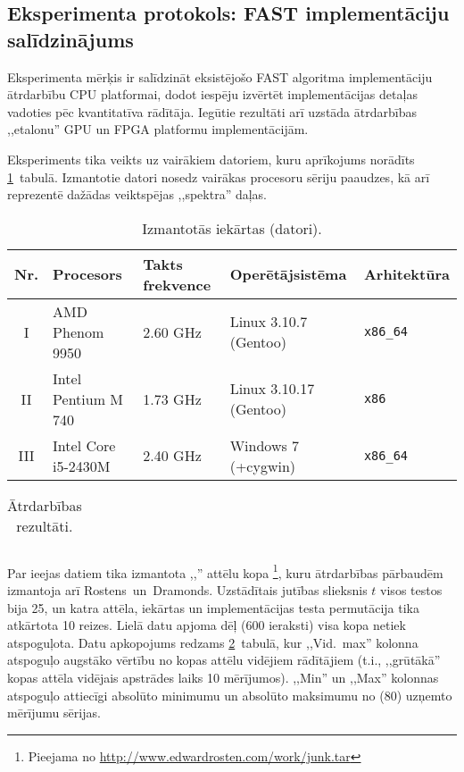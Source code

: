 \subsection{Eksperimenta protokols: FAST implementāciju salīdzinājums}\label{appx:test1}
Eksperimenta mērķis ir salīdzināt
eksistējošo FAST algoritma implementāciju ātrdarbību CPU platformai, 
dodot iespēju izvērtēt implementācijas detaļas vadoties 
pēc kvantitatīva rādītāja. Iegūtie rezultāti arī uzstāda ātrdarbības 
,,etalonu'' GPU un FPGA platformu implementācijām.

Eksperiments tika veikts uz vairākiem datoriem, kuru aprīkojums norādīts
\ref{tbl:test1-dev}~tabulā. Izmantotie datori nosedz vairākas procesoru
sēriju paaudzes, kā arī reprezentē dažādas veiktspējas ,,spektra'' daļas.
\begin{table}[hb]\footnotesize
	\centering
	\caption{Izmantotās iekārtas (datori).}
	\label{tbl:test1-dev}
	\vspace{4pt}
	\begin{tabular}{cllll}
		\toprule
		\textbf{Nr.} & \textbf{Procesors} & \textbf{Takts frekvence} & 
			\textbf{Operētājsistēma} & \textbf{Arhitektūra}\\
		\midrule
		I & AMD Phenom 9950 & 2.60 GHz & Linux 3.10.7 (Gentoo) & \texttt{x86\_64}\\
		II & Intel Pentium M 740 & 1.73 GHz & Linux 3.10.17 (Gentoo) & \texttt{x86}\\
		III & Intel Core i5-2430M & 2.40 GHz & Windows 7 (+cygwin) & \texttt{x86\_64}\\
		\bottomrule
	\end{tabular}
\end{table}

\begin{table}[hb]\small
	\centering
	\caption{Ātrdarbības rezultāti.}
	\label{tbl:test1-data}
	\vspace{4pt}
	\begin{tabular}{clcccr}
		\toprule
		
		\bottomrule
	\end{tabular}
\end{table}

Par ieejas datiem tika izmantota ,,'' attēlu kopa%
	\footnote{Pieejama no \url{http://www.edwardrosten.com/work/junk.tar}},
kuru ātrdarbības pārbaudēm izmantoja arī Rostens~un~Dramonds\cite{FAST}.
Uzstādītais jutības slieksnis $t$ visos testos bija 25, un katra 
attēla, iekārtas un implementācijas testa permutācija tika atkārtota 10 reizes.
Lielā datu apjoma dēļ (600 ieraksti) visa kopa netiek atspoguļota. Datu
apkopojums redzams \ref{tbl:test1-data}~tabulā, kur ,,Vid.~max'' kolonna
atspoguļo augstāko vērtību no kopas attēlu vidējiem rādītājiem
(t.i., ,,grūtākā'' kopas attēla vidējais apstrādes laiks 10 mērījumos).
,,Min'' un ,,Max'' kolonnas atspoguļo attiecīgi absolūto minimumu un absolūto
maksimumu no (80) uzņemto mērījumu sērijas. \TODO

